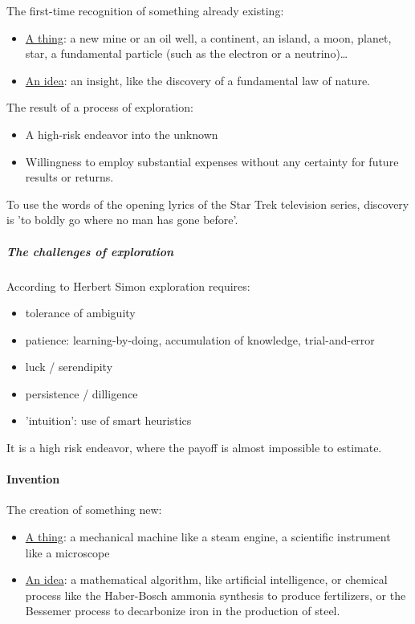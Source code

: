 The first-time recognition of something already existing:
\begin{itemize}
    \item \underline{A thing}: a new mine or an oil well, a continent, an
        island, a moon, planet, star, a fundamental particle (such as the
        electron or a neutrino)\dots
    \item \underline{An idea}: an insight, like the discovery of a fundamental
        law of nature.
\end{itemize}

The result of a process of exploration:
\begin{itemize}
    \item A high-risk endeavor into the unknown
    \item Willingness to employ substantial expenses without any certainty
        for future results or returns.
\end{itemize}

To use the words of the opening lyrics of the Star Trek television series,
discovery is 'to boldly go where no man has gone before'.

\subparagraph{The challenges of exploration}
According to Herbert Simon exploration requires:
\begin{itemize}
    \item tolerance of ambiguity
    \item patience: learning-by-doing, accumulation of knowledge, trial-and-error
    \item luck / serendipity
    \item persistence / dilligence
    \item 'intuition': use of smart heuristics
\end{itemize}

It is a high risk endeavor, where the payoff is almost impossible to estimate.

\paragraph{Invention}

The creation of something new:
\begin{itemize}
    \item \underline{A thing}: a mechanical machine like a steam engine, a
        scientific instrument like a microscope
    \item \underline{An idea}: a mathematical algorithm, like artificial
        intelligence, or chemical process like the Haber-Bosch ammonia
        synthesis to produce fertilizers, or the Bessemer process to decarbonize
        iron in the production of steel.
\end{itemize}

